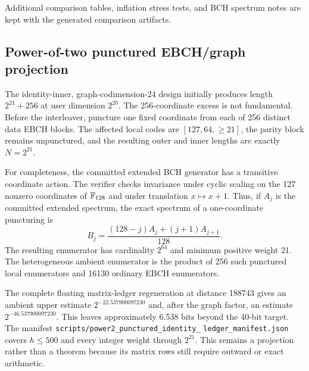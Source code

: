 Additional comparison tables, inflation stress tests, and BCH spectrum notes
are kept with the generated comparison artifacts.

\subsection{Power-of-two punctured EBCH/graph projection}
\label{sec:power-two-punctured-ebch-projection}

The identity-inner, graph-codimension-24 design initially produces length
$2^{21}+256$ at user dimension $2^{20}$.  The 256-coordinate excess is not
fundamental.  Before the interleaver, puncture one fixed coordinate from each
of 256 distinct data EBCH blocks.  The affected local codes are
$[127,64,\ge21]$, the parity block remains unpunctured, and the resulting
outer and inner lengths are exactly $N=2^{21}$.

For completeness, the committed extended BCH generator has a transitive
coordinate action.  The verifier checks invariance under cyclic scaling on
the 127 nonzero coordinates of $\mathbb{F}_{128}$ and under translation $x\mapsto
x+1$.  Thus, if $A_j$ is the committed extended spectrum, the exact spectrum
of a one-coordinate puncturing is
\[
 B_j=\frac{(128-j)A_j+(j+1)A_{j+1}}{128}.
\]
The resulting enumerator has cardinality $2^{64}$ and minimum positive weight
21.  The heterogeneous ambient enumerator is the product of 256 such
punctured local enumerators and 16130 ordinary EBCH enumerators.

The complete floating matrix-ledger regeneration at distance 188743 gives an
ambient upper estimate $2^{-22.537900097230}$ and, after the graph factor, an
estimate $2^{-46.537900097230}$.  This leaves approximately 6.538 bits beyond
the 40-bit target.  The manifest
\texttt{scripts/power2\_punctured\_identity\_}\allowbreak
\texttt{ledger\_manifest.json} covers
$h\le500$ and every integer weight through $2^{21}$.  This remains a
projection rather than a theorem because its matrix rows still require
outward or exact arithmetic.

